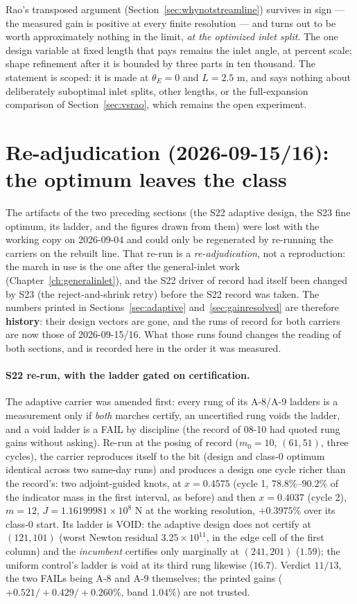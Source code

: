 Rao's transposed argument (Section~\ref{sec:whynotstreamline})
survives in sign --- the measured gain is positive at every finite
resolution --- and turns out to be worth approximately nothing in
the limit, \emph{at the optimized inlet split}. The one design
variable at fixed length that pays remains the inlet angle, at
percent scale; shape refinement after it is bounded by three parts
in ten thousand. The statement is scoped: it is made at
$\theta_E = 0$ and $L = 2.5$ m, and says nothing about deliberately
suboptimal inlet splits, other lengths, or the full-expansion
comparison of Section~\ref{sec:vsrao}, which remains the open
experiment.

\section{Re-adjudication (2026-09-15/16): the optimum leaves the class}
\label{sec:readjudication}

The artifacts of the two preceding sections (the S22 adaptive design,
the S23 fine optimum, its ladder, and the figures drawn from them)
were lost with the working copy on 2026-09-04 and could only be
regenerated by re-running the carriers on the rebuilt line. That
re-run is a \emph{re-adjudication}, not a reproduction: the march in
use is the one after the general-inlet work (Chapter~\ref{ch:generalinlet}),
and the S22 driver of record had itself been changed by S23 (the
reject-and-shrink retry) before the S22 record was taken. The numbers
printed in Sections~\ref{sec:adaptive} and~\ref{sec:gainresolved} are
therefore \textbf{history}: their design vectors are gone, and the
runs of record for both carriers are now those of 2026-09-15/16. What
those runs found changes the reading of both sections, and is
recorded here in the order it was measured.

\paragraph{S22 re-run, with the ladder gated on certification.} The
adaptive carrier was amended first: every rung of its A-8/A-9 ladders
is a measurement only if \emph{both} marches certify, an uncertified
rung voids the ladder, and a void ladder is a FAIL by discipline (the
record of 08-10 had quoted rung gains without asking). Re-run at the
posing of record ($m_0 = 10$, $(61,51)$, three cycles), the carrier
reproduces itself to the bit (design and class-0 optimum identical
across two same-day runs) and produces a design one cycle richer than
the record's: two adjoint-guided knots, at $x = 0.4575$ (cycle 1,
$78.8\%$--$90.2\%$ of the indicator mass in the first interval, as
before) and then $x = 0.4037$ (cycle 2), $m = 12$, $J =
1.16199981\times10^{8}$ N at the working resolution, $+0.3975\%$ over
its class-0 start. Its ladder is VOID: the adaptive design does not
certify at $(121,101)$ (worst Newton residual $3.25\times10^{11}$, in
the edge cell of the first column) and the \emph{incumbent} certifies
only marginally at $(241,201)$ ($1.59$); the uniform control's ladder
is void at its third rung likewise ($16.7$). Verdict $11/13$, the two
FAILs being A-8 and A-9 themselves; the printed gains
($+0.521/+0.429/+0.260\%$, band $1.04\%$) are not trusted.

